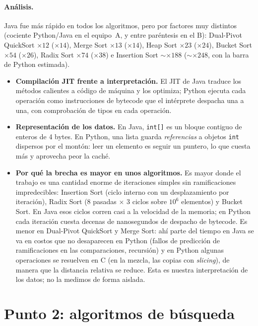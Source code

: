\documentclass[11pt,a4paper]{article}
\newcommand{\code}[1]{\texttt{#1}}
\begin{document}
\paragraph{An\'alisis.} Java fue m\'as r\'apido en todos los algoritmos, pero por factores muy distintos
(cociente Python/Java en el equipo~A, y entre par\'entesis en el B): Dual-Pivot QuickSort $\times12$ ($\times14$),
Merge Sort $\times13$ ($\times14$), Heap Sort $\times23$ ($\times24$), Bucket Sort $\times54$ ($\times26$),
Radix Sort $\times74$ ($\times38$) e Insertion Sort $\sim\times188$ ($\sim\times248$, con la barra de Python
estimada).
\begin{itemize}
  \item \textbf{Compilaci\'on JIT frente a interpretaci\'on.} El JIT de Java traduce los m\'etodos calientes a
  c\'odigo de m\'aquina y los optimiza; Python ejecuta cada operaci\'on como instrucciones de bytecode que el
  int\'erprete despacha una a una, con comprobaci\'on de tipos en cada operaci\'on.
  \item \textbf{Representaci\'on de los datos.} En Java, \code{int[]} es un bloque contiguo de enteros de 4
  bytes. En Python, una lista guarda \emph{referencias} a objetos \code{int} dispersos por el mont\'on: leer un
  elemento es seguir un puntero, lo que cuesta m\'as y aprovecha peor la cach\'e.
  \item \textbf{Por qu\'e la brecha es mayor en unos algoritmos.} Es mayor donde el trabajo es una cantidad
  enorme de iteraciones simples sin ramificaciones impredecibles: Insertion Sort (ciclo interno con un
  desplazamiento por iteraci\'on), Radix Sort (8 pasadas $\times$ 3 ciclos sobre $10^6$ elementos) y Bucket Sort.
  En Java esos ciclos corren casi a la velocidad de la memoria; en Python cada iteraci\'on cuesta decenas de
  nanosegundos de despacho de bytecode. Es menor en Dual-Pivot QuickSort y Merge Sort: ah\'i parte del tiempo en
  Java se va en costos que no desaparecen en Python (fallos de predicci\'on de ramificaciones en las
  comparaciones, recursi\'on) y en Python algunas operaciones se resuelven en C (en la mezcla, las copias con
  \emph{slicing}), de manera que la distancia relativa se reduce. Esta es nuestra interpretaci\'on de los
  datos; no la medimos de forma aislada.
\end{itemize}

\section{Punto 2: algoritmos de b\'usqueda}\label{sec:p2}
\end{document}
